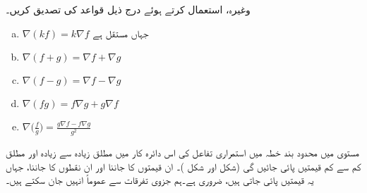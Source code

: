 وغیرہ،  استعمال کرتے ہوئے درج ذیل قواعد کی تصدیق کریں۔
\begin{enumerate}[a.]
\item
$\nabla(kf)=k\nabla f$\quad
جہاں  مستقل ہے
\item
$\nabla (f+g)=\nabla f+\nabla g$
\item
$\nabla (f-g)=\nabla f-\nabla g$
\item
$\nabla (fg)=f\nabla g+g\nabla f$
\item
$\nabla\big(\frac{f}{g}\big)=\frac{g\nabla f-f\nabla g}{g^2}$
\end{enumerate}

مستوی  میں محدود   بند خطہ میں استمراری تفاعل  کی اس دائرہ کار میں مطلق زیادہ سے زیادہ اور مطلق کم سے کم قیمتیں پائی جائیں گی (شکل  اور شکل )۔ ان قیمتوں  کا جاننا اور ان نقطوں کا  جاننا،   جہاں یہ قیمتیں پائی جاتی ہیں،  ضروری ہے۔ہم جزوی تفرقات  سے  عموماً انہیں جان سکتے ہیں۔

